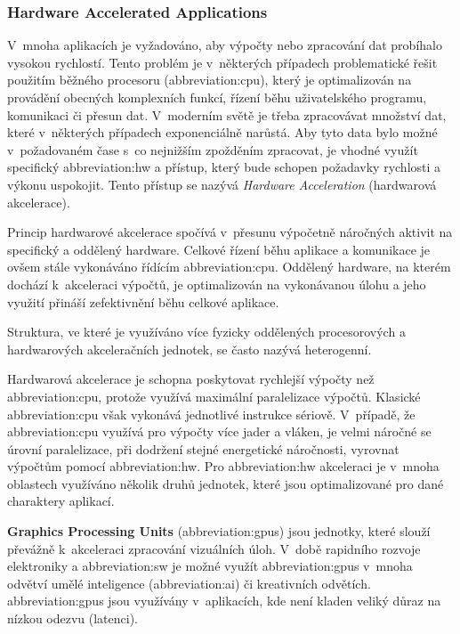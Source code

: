 \documentclass[a4paper, twoside, 11pt]{article}
\begin{document}
		\subsubsection{Hardware Accelerated Applications}\label{subsec:hardware-accelerated-applications}
		V~mnoha aplikacích je vyžadováno, aby výpočty nebo zpracování dat probíhalo vysokou rychlostí. Tento problém je v~některých případech problematické řešit použitím běžného procesoru (\gls{abbreviation:cpu}), který je optimalizován na provádění obecných komplexních funkcí, řízení běhu uživatelského programu, komunikaci či přesun dat. V~moderním světě je třeba zpracovávat množství dat, které v~některých případech exponenciálně narůstá. Aby tyto data bylo možné v~požadovaném čase s~co nejnižším zpožděním zpracovat, je vhodné využít specifický \gls{abbreviation:hw} a přístup, který bude schopen požadavky rychlosti a výkonu uspokojit. Tento přístup se nazývá \textit{Hardware Acceleration} (hardwarová akcelerace). \cite{xilinx-accelerated-computing}\par
		Princip hardwarové akcelerace spočívá v~přesunu výpočetně náročných aktivit na specifický a oddělený hardware. Celkové řízení běhu aplikace a komunikace je ovšem stále vykonáváno řídícím \gls{abbreviation:cpu}. Oddělený hardware, na kterém dochází k~akceleraci výpočtů, je optimalizován na vykonávanou úlohu a jeho využití přináší zefektivnění běhu celkové aplikace. \cite{xilinx-accelerated-computing}\par
		Struktura, ve které je využíváno více fyzicky oddělených procesorových a hardwarových akceleračních jednotek, se často nazývá heterogenní. \cite{xilinx-accelerated-computing}\par
		Hardwarová akcelerace je schopna poskytovat rychlejší výpočty než \gls{abbreviation:cpu}, protože využívá maximální paralelizace výpočtů. Klasické \gls{abbreviation:cpu} však vykonává jednotlivé instrukce sériově. V~případě, že \gls{abbreviation:cpu} využívá pro výpočty více jader a vláken, je velmi náročné se úrovní paralelizace, při dodržení stejné energetické náročnosti, vyrovnat výpočtům pomocí \gls{abbreviation:hw}.
		Pro \gls{abbreviation:hw} akceleraci je v~mnoha oblastech využíváno několik druhů jednotek, které jsou optimalizované pro dané charaktery aplikací.\par
		\textbf{Graphics Processing Units} (\gls{abbreviation:gpus}) jsou jednotky, které slouží převážně k~akceleraci zpracování vizuálních úloh. V~době rapidního rozvoje elektroniky a \gls{abbreviation:sw} je možné využít \gls{abbreviation:gpus} v~mnoha odvětví umělé inteligence (\gls{abbreviation:ai}) či kreativních odvětích. \gls{abbreviation:gpus} jsou využívány v~aplikacích, kde není kladen veliký důraz na nízkou odezvu (latenci). \cite{xilinx-accelerated-computing}\par
\end{document}
